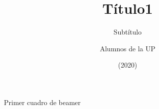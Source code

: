 \documentclass{beamer}
\title[Título]{Título1}
\subtitle{Subtítulo}
\author[Primer autor]{Alumnos de la UP}
\institute{Universidad del Pacífico}
\date[2020]{\scriptsize(2020)}
\begin{document}
\begin{frame}
\titlepage
\end{frame}


\begin{frame}
Primer cuadro de beamer
\end{frame}
\end{document}
